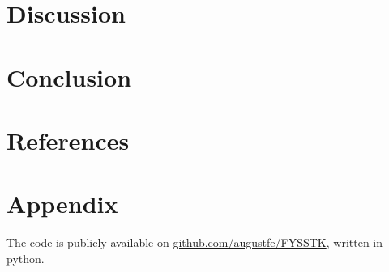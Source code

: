 \documentclass{article}
\theoremstyle{definition}
\begin{document}
\newpage
\section{Discussion}

\section{Conclusion}

\section{References}

\printbibliography

\section{Appendix}
The code is publicly available on \href{https://github.com/augustfe/FYSSTK}{github.com/augustfe/FYSSTK}, written in python.
\end{document}
